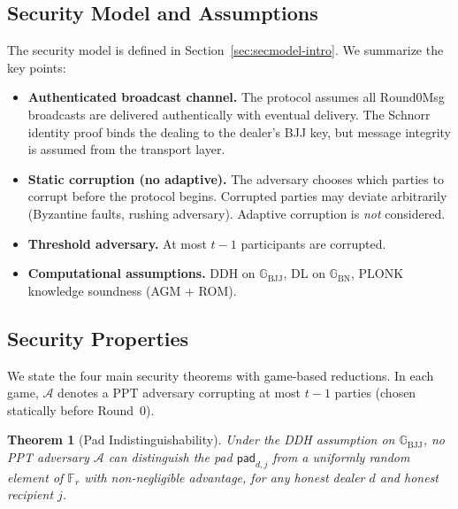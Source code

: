 \documentclass[11pt,a4paper]{article}
\newtheorem{theorem}{Theorem}[section]
\newcommand{\F}{\mathbb{F}}
\newcommand{\G}{\mathbb{G}}
\newcommand{\Gbj}{\G_{\mathrm{BJJ}}}
\newcommand{\Gbn}{\G_{\mathrm{BN}}}
\newcommand{\Fr}{\F_r}
\newcommand{\pad}{\mathsf{pad}}
\begin{document}
\subsection{Security Model and Assumptions}
\label{sec:secmodel}

The security model is defined in Section~\ref{sec:secmodel-intro}. We
summarize the key points:

\begin{itemize}
  \item \textbf{Authenticated broadcast channel.} The protocol assumes all
    Round0Msg broadcasts are delivered authentically with eventual delivery.
    The Schnorr identity proof binds the dealing to the dealer's BJJ key, but
    message integrity is assumed from the transport layer.

  \item \textbf{Static corruption (no adaptive).} The adversary chooses which
    parties to corrupt before the protocol begins. Corrupted parties may deviate
    arbitrarily (Byzantine faults, rushing adversary). Adaptive corruption is
    \emph{not} considered.

  \item \textbf{Threshold adversary.} At most $t - 1$ participants are
    corrupted.

  \item \textbf{Computational assumptions.} DDH on $\Gbj$, DL on $\Gbn$,
    PLONK knowledge soundness (AGM + ROM).
\end{itemize}

\subsection{Security Properties}
\label{sec:secprops}

We state the four main security theorems with game-based reductions.
In each game, $\mathcal{A}$ denotes a PPT adversary corrupting at most
$t - 1$ parties (chosen statically before Round~0).

\begin{theorem}[Pad Indistinguishability]
  \label{thm:pad-ind}
  Under the DDH assumption on $\Gbj$, no PPT adversary $\mathcal{A}$ can
  distinguish the pad $\pad_{d,j}$ from a uniformly random element of $\Fr$
  with non-negligible advantage, for any honest dealer $d$ and honest
  recipient $j$.
\end{theorem}
\end{document}
